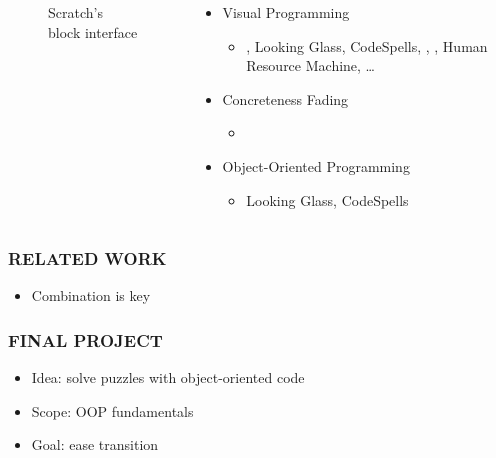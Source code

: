 \documentclass{beamer}
\let\theframetitle\frametitle
\renewcommand\frametitle[1]{\theframetitle{\MakeUppercase{#1}}}
\begin{document}
\begin{frame}
\begin{columns}[onlytextwidth]
\begin{column}{.3\textwidth}
{\begin{figure}
        \caption{Scratch's block interface}
      \end{figure}
    }
  \end{column}
  \begin{column}{.65\textwidth}
    \begin{itemize}
    \item<1-> Visual Programming
      \begin{itemize}
      \item{}, Looking Glass,
        CodeSpells, ,
        , Human Resource Machine,
        …
      \end{itemize}
    \item<2-> Concreteness Fading
      \begin{itemize}
      \item{}
      \end{itemize}
    \item<3-> Object-Oriented Programming
      \begin{itemize}
      \item Looking Glass, CodeSpells
      \end{itemize}
    \end{itemize}
  \end{column}
\end{columns}
\end{frame}

\begin{frame}
\frametitle{Related Work}
\begin{itemize}[<+->]
\item Combination is key
\end{itemize}
\end{frame}

\begin{frame}
\frametitle{Final Project}
\begin{itemize}[<+->]
\item Idea: solve puzzles with object-oriented code
\item Scope: OOP fundamentals
\item Goal: ease transition
\end{itemize}
\end{frame}
\end{document}

